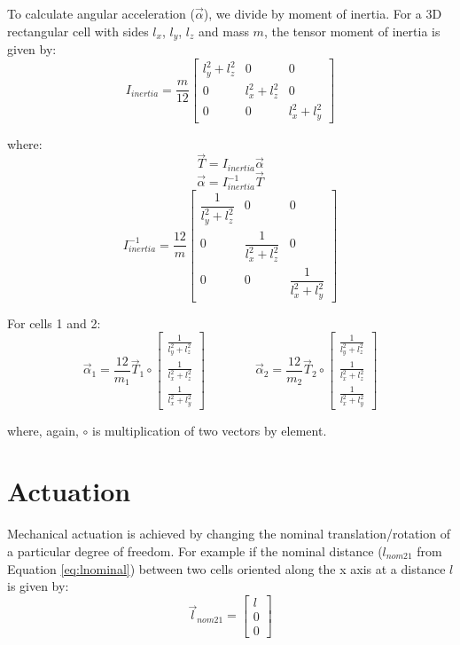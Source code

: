 {To calculate angular acceleration ($\vec{\alpha}$), we divide by moment of inertia.  For a 3D rectangular cell with sides $l_x$, $l_y$, $l_z$ and mass $m$, the tensor moment of inertia is given by:
\[ I_{inertia} = \dfrac{m}{12} \left[ \begin{array}{ccc}
l_y^2+l_z^2 & 0 & 0\\
0 & l_x^2+l_z^2 & 0\\
0 & 0 & l_x^2+l_y^2
 \end{array} \right] \]
 
 where:
 \[ \vec{T} = I_{inertia}\vec{\alpha} \]
  \[ \vec{\alpha}  = I_{inertia}^{-1}\vec{T} \]
  \[ I_{inertia}^{-1} = \dfrac{12}{m} \left[ \begin{array}{ccc}
\dfrac{1}{l_y^2+l_z^2} & 0 & 0\\
0 & \dfrac{1}{l_x^2+l_z^2} & 0\\
0 & 0 & \dfrac{1}{l_x^2+l_y^2}
 \end{array} \right] \]
 
For cells 1 and 2:
 \[ \vec{\alpha}_1 = \dfrac{12}{m_1} \vec{T}_1 \circ 
 \left[ \begin{smallmatrix}
\tfrac{1}{l_y^2+l_z^2}\\
\tfrac{1}{l_x^2+l_z^2}\\
\tfrac{1}{l_x^2+l_y^2}
 \end{smallmatrix} \right] 
  \qquad\qquad
   \vec{\alpha}_2 = \dfrac{12}{m_2} \vec{T}_2 \circ
   \left[ \begin{smallmatrix}
\tfrac{1}{l_y^2+l_z^2}\\
\tfrac{1}{l_x^2+l_z^2}\\
\tfrac{1}{l_x^2+l_y^2}
 \end{smallmatrix} \right] 
  \]
  
  where, again, $\circ$ is multiplication of two vectors by element.

\section{Actuation}

Mechanical actuation is achieved by changing the nominal translation/rotation of a particular degree of freedom.  For example if the nominal distance ($l_{nom21}$ from Equation \ref{eq:lnominal}) between two cells oriented along the x axis at a distance $l$ is given by:
\[ \vec{l}_{nom21} =  \left[ \begin{array}{ccc}
l\\
0\\
0
 \end{array} \right] \]
 
}
